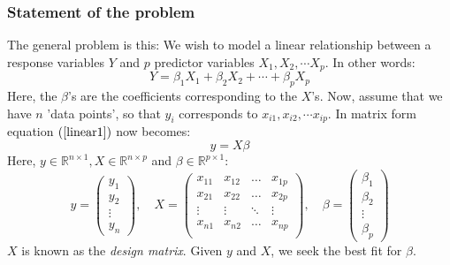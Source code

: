 \documentclass[12pt, a4paper]{article}
\begin{document}
\subsubsection{Statement of the problem}
The general problem is this: We wish to model a linear relationship between a response variables $Y$ and $p$ predictor variables $X_1, X_2,\cdots X_p$. In other words:
\begin{equation}
\label{linear1}
Y=\beta_1 X_1 + \beta_2 X_2 + \cdots + \beta_p X_p
\end{equation}
Here, the $\beta$'s are the coefficients corresponding to the $X$'s. Now, assume that we have $n$ 'data points', so that $y_i$ corresponds to $x_{i1}, x_{i2},\cdots x_{ip}$. In matrix form equation $(\ref{linear1})$ now becomes: 
\begin{equation}
\label{linear2}
y=X\beta
\end{equation}
Here, $y\in\mathbb{R}^{n\times 1}, X\in\mathbb{R}^{n\times p}$ and $\beta\in\mathbb{R}^{p\times 1}$:
\begin{equation}
y = 
\begin{pmatrix}
	y_1 \\ y_2 \\ \vdots \\ y_n
\end{pmatrix},\quad
X =
\begin{pmatrix}
	x_{11} 	& x_{12} 	& \ldots	& x_{1p} \\
	x_{21} 	& x_{22} 	& \ldots	& x_{2p} \\
	\vdots	& \vdots	& \ddots	& \vdots \\
	x_{n1} 	& x_{n2} 	& \ldots	& x_{np} \\
\end{pmatrix},\quad
\beta =
\begin{pmatrix}
	\beta_1	\\ \beta_2	\\ \vdots\\	\beta_p 
\end{pmatrix}
\end{equation}
$X$ is known as the \textit{design matrix}. Given $y$ and $X$, we seek the best fit for $\beta$.
\end{document}

